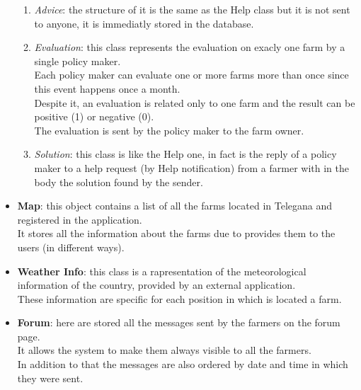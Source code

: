 \begin{itemize}
\begin{enumerate}
            \item \textsl{Advice}: the structure of it is the same as the Help class but it is not sent to anyone,
             it is immediatly stored in the database.
            \item \textsl{Evaluation}: this class represents the evaluation on exacly one farm by a single policy maker.\\ Each policy maker can evaluate one or more 
            farms more than once since this event happens once a month.\\ Despite it, an evaluation is related only to one farm and the result can be positive (1) or negative (0).\\ The evaluation is sent by the policy maker to the farm owner.
            \item \textsl{Solution}: this class is like the Help one, in fact is the reply of a policy maker to a help request (by Help notification) from a farmer with in the body the solution found by the sender.
        \end{enumerate}
    
    \item \textbf{Map}: this object contains a list of all the farms located in Telegana and registered in the application.\\It stores all the information about the farms due to provides them to the users (in different ways).
    \item \textbf{Weather Info}: this class is a rapresentation of the meteorological information of the country, provided by an external application.\\These information are specific for each position in which is located a farm.
    
    \item \textbf{Forum}: here are stored all the messages sent by the farmers on the forum page.\\ It allows the system to make them always visible to all the farmers.\\ In addition to that the messages are also ordered by date and time in which they were sent.
    
\end{itemize}
